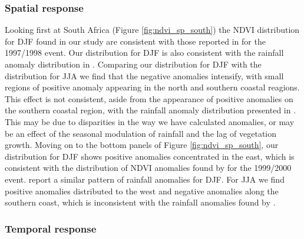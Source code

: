 \subsubsection{Spatial response}
Looking first at South Africa (Figure \ref{fig:ndvi_sp_south}) the
NDVI distribution for DJF \elnino{} found in our study are consistent
with those reported in \cite{anyamba2002} for the 1997/1998 \elnino{}
event. Our distribution for DJF \elnino{} is also consistent with the
rainfall anomaly distribution in \cite{deoliveira2018}. Comparing our
distribution for DJF \elnino{} with the distribution for JJA \elnino{}
we find that the negative anomalies intensify, with small regions of
positive anomaly appearing in the north and southern coastal
reagions. This effect is not consistent, aside from the appearance of
positive anomalies on the southern coastal region, with the rainfall
anomaly distribution presented in \cite{deoliveira2018}. This may be
due to disparities in the way we have calculated anomalies, or may be
an effect of the seasonal modulation of rainfall and the lag of
vegetation growth. Moving on to the bottom panels of Figure
\ref{fig:ndvi_sp_south}, our distribution for DJF \nina{} shows
positive anomalies concentrated in the east, which is consistent with
the distribution of NDVI anomalies found by \cite{anyamba2002} for the
1999/2000 \nina{} event. \cite{deoliveira2018} report a similar
pattern of rainfall anomalies for DJF. For JJA we find positive
anomalies distributed to the west and negative anomalies along the
southern coast, which is inconsistent with the rainfall anomalies
found by \cite{deoliveira2018}.

\subsubsection{Temporal response}

